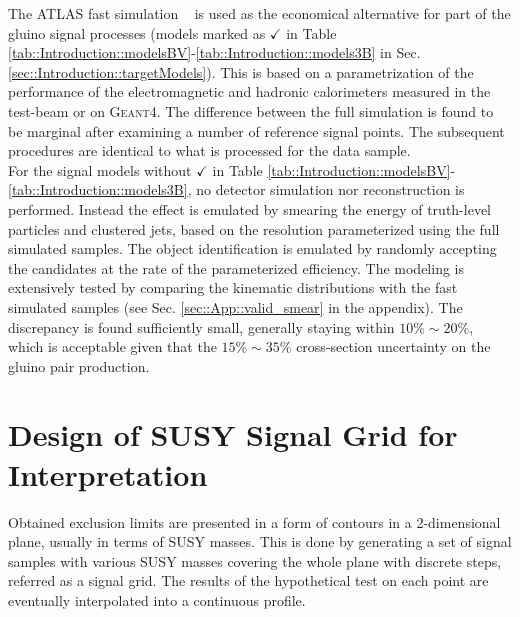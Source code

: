 The ATLAS fast simulation ~\cite{atlfast} is used as the economical alternative for part of the gluino signal processes (models marked as $\checkmark$ in Table \ref{tab::Introduction::modelsBV}-\ref{tab::Introduction::models3B} in Sec. \ref{sec::Introduction::targetModels}). 
This is based on a parametrization of the performance of the electromagnetic and hadronic calorimeters measured in the test-beam or on \textsc{Geant4}. 
The difference between the full simulation is found to be marginal after examining a number of reference signal points.
The subsequent procedures are identical to what is processed for the data sample. \\

For the signal models without $\checkmark$ in Table \ref{tab::Introduction::modelsBV}-\ref{tab::Introduction::models3B}, no detector simulation nor reconstruction is performed. Instead the effect is emulated by smearing the energy of truth-level particles and clustered jets, based on the resolution parameterized using the full simulated samples. The object identification is emulated by randomly accepting the candidates at the rate of the parameterized efficiency. The modeling is extensively tested by comparing the kinematic distributions with the fast simulated samples (see Sec. \ref{sec::App::valid_smear} in the appendix). The discrepancy is found sufficiently small, generally staying within $10\%\sim20\%$, which is acceptable given that the $15\%\sim35\%$ cross-section uncertainty on the gluino pair production. \\



\section{Design of SUSY Signal Grid for Interpretation} 
Obtained exclusion limits are presented in a form of contours in a 2-dimensional plane, usually in terms of SUSY masses. This is done by generating a set of signal samples with various SUSY masses covering the whole plane with discrete steps, referred as a signal grid. The results of the hypothetical test on each point are eventually interpolated into a continuous profile. \\

